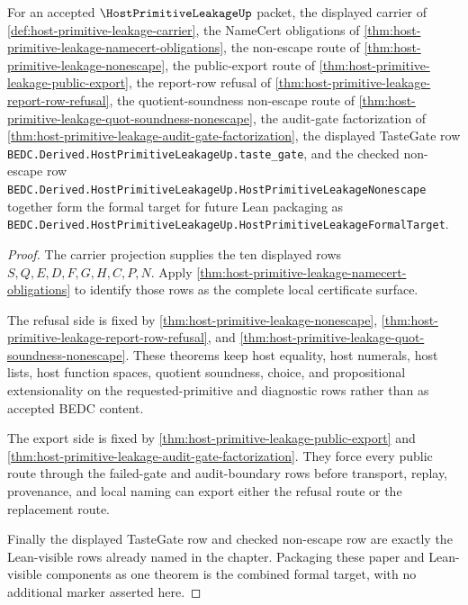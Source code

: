 \begin{theorem}
\label{thm:host-primitive-leakage-formal-target}
For an accepted $\HostPrimitiveLeakageUp$ packet, the displayed carrier of \autoref{def:host-primitive-leakage-carrier}, the NameCert obligations of \autoref{thm:host-primitive-leakage-namecert-obligations}, the non-escape route of \autoref{thm:host-primitive-leakage-nonescape}, the public-export route of \autoref{thm:host-primitive-leakage-public-export}, the report-row refusal of \autoref{thm:host-primitive-leakage-report-row-refusal}, the quotient-soundness non-escape route of \autoref{thm:host-primitive-leakage-quot-soundness-nonescape}, the audit-gate factorization of \autoref{thm:host-primitive-leakage-audit-gate-factorization}, the displayed TasteGate row \texttt{BEDC.Derived.HostPrimitiveLeakageUp.taste\_gate}, and the checked non-escape row \texttt{BEDC.Derived.HostPrimitiveLeakageUp.HostPrimitiveLeakageNonescape} together form the formal target for future Lean packaging as \texttt{BEDC.Derived.HostPrimitiveLeakageUp.HostPrimitiveLeakageFormalTarget}.
\end{theorem}
\begin{proof}
The carrier projection supplies the ten displayed rows $S,Q,E,D,F,G,H,C,P,N$. Apply \autoref{thm:host-primitive-leakage-namecert-obligations} to identify those rows as the complete local certificate surface.

The refusal side is fixed by \autoref{thm:host-primitive-leakage-nonescape}, \autoref{thm:host-primitive-leakage-report-row-refusal}, and \autoref{thm:host-primitive-leakage-quot-soundness-nonescape}. These theorems keep host equality, host numerals, host lists, host function spaces, quotient soundness, choice, and propositional extensionality on the requested-primitive and diagnostic rows rather than as accepted BEDC content.

The export side is fixed by \autoref{thm:host-primitive-leakage-public-export} and \autoref{thm:host-primitive-leakage-audit-gate-factorization}. They force every public route through the failed-gate and audit-boundary rows before transport, replay, provenance, and local naming can export either the refusal route or the replacement route.

Finally the displayed TasteGate row and checked non-escape row are exactly the Lean-visible rows already named in the chapter. Packaging these paper and Lean-visible components as one theorem is the combined formal target, with no additional marker asserted here.
\end{proof}

